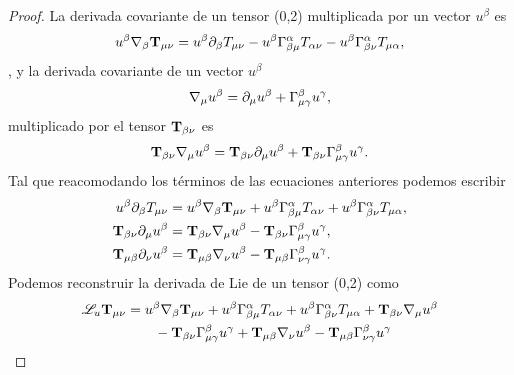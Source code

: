 \begin{proof}
  
 La derivada covariante de un tensor (0,2) multiplicada por un vector $u^\beta$ es
 \begin{equation}
     u^\beta \mathbf{\nabla}_\beta {\ensuremath{\mathbf{T}}}_{\mu \nu} = u^\beta \partial_\beta T_{\mu \nu} - u^\beta \Gamma_{\beta \mu}^\alpha T_{\alpha \nu} - u^\beta \Gamma_{\beta \nu}^\alpha T_{\mu \alpha},
 \end{equation},
 y la derivada covariante de un vector $u^\beta$ 
 \begin{equation}
     \mathbf{\nabla}_\mu u^\beta =  \partial_\mu u^\beta + \Gamma^\beta_{\mu \gamma} u^\gamma,
 \end{equation}
 multiplicado por el tensor ${\mathbf{T}}_{\beta \nu}$ es
 \begin{equation}
     {\ensuremath{\mathbf{T}}}_{\beta \nu}\mathbf{\nabla}_\mu u^\beta =  {\mathbf{T}}_{\beta \nu}\partial_\mu u^\beta +{\mathbf{T}}_{\beta \nu}\Gamma^\beta_{\mu \gamma} u^\gamma.
 \end{equation}
 Tal que reacomodando los términos de las ecuaciones anteriores podemos escribir
 \begin{equation}
     \begin{aligned}
         u^\beta \partial_\beta T_{\mu \nu}      & = u^\beta \mathbf{\nabla}_\beta {\ensuremath{\mathbf{T}}}_{\mu \nu} +u^\beta \Gamma_{\beta \mu}^\alpha T_{\alpha \nu} + u^\beta \Gamma_{\beta \nu}^\alpha T_{\mu \alpha}, \\
         {\mathbf{T}}_{\beta \nu}\partial_\mu u^\beta   & = {\mathbf{T}}_{\beta \nu}\mathbf{\nabla}_\mu u^\beta - {\mathbf{T}}_{\beta \nu}\Gamma^\beta_{\mu \gamma} u^\gamma                                                 , \\
         {\mathbf{T}}_{\mu \beta } \partial_\nu u^\beta & = {\mathbf{T}}_{\mu \beta } \mathbf{\nabla}_\nu u^\beta -  {\mathbf{T}}_{\mu \beta } \Gamma^\beta_{\nu \gamma} u^\gamma.
     \end{aligned}
 \end{equation}
 Podemos reconstruir la derivada de Lie de un tensor (0,2) como
 \begin{equation}
     \begin{aligned}
         \mathscr{L}_u \T{T}_{\mu \nu} & = u^\beta \v{\nabla}_\beta \T{T}_{\mu \nu} +u^\beta \Gamma_{\beta \mu}^\alpha T_{\alpha \nu} + u^\beta \Gamma_{\beta \nu}^\alpha T_{\mu \alpha} + \T{T}_{\beta \nu}\v{\nabla}_\mu u^\beta \\
         & \qquad  - \T{T}_{\beta \nu}\Gamma^\beta_{\mu \gamma} u^\gamma +\T{T}_{\mu \beta } \v{\nabla}_\nu u^\beta -  \T{T}_{\mu \beta } \Gamma^\beta_{\nu \gamma} u^\gamma \\

\end{aligned}
\end{equation}
\end{proof}
